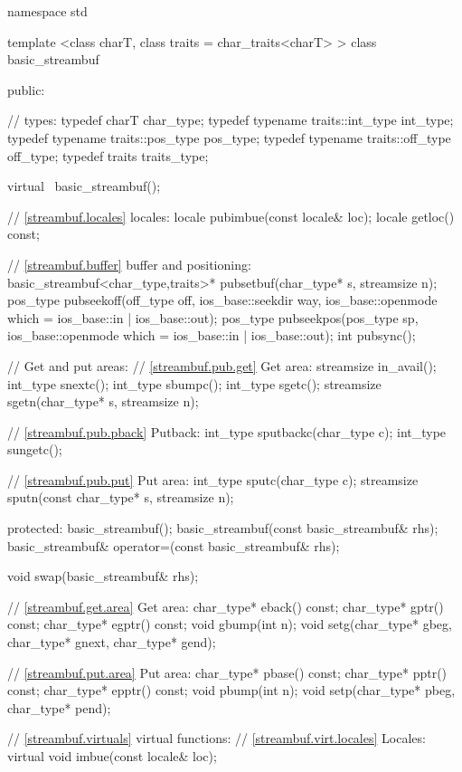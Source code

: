 %
\begin{codeblock}
namespace std {
  template <class charT, class traits = char_traits<charT> >
  class basic_streambuf {
  public:

    // types:
    typedef charT                     char_type;
    typedef typename traits::int_type int_type;
    typedef typename traits::pos_type pos_type;
    typedef typename traits::off_type off_type;
    typedef traits                    traits_type;

    virtual ~basic_streambuf();

    // \ref{streambuf.locales} locales:
    locale   pubimbue(const locale& loc);
    locale   getloc() const;

    // \ref{streambuf.buffer} buffer and positioning:
    basic_streambuf<char_type,traits>*
       pubsetbuf(char_type* s, streamsize n);
    pos_type pubseekoff(off_type off, ios_base::seekdir way,
      ios_base::openmode which =
          ios_base::in | ios_base::out);
    pos_type pubseekpos(pos_type sp,
      ios_base::openmode which =
          ios_base::in | ios_base::out);
    int      pubsync();

    // Get and put areas:
    // \ref{streambuf.pub.get} Get area:
    streamsize in_avail();
    int_type snextc();
    int_type sbumpc();
    int_type sgetc();
    streamsize sgetn(char_type* s, streamsize n);

    // \ref{streambuf.pub.pback} Putback:
    int_type sputbackc(char_type c);
    int_type sungetc();

    // \ref{streambuf.pub.put} Put area:
    int_type   sputc(char_type c);
    streamsize sputn(const char_type* s, streamsize n);

  protected:
    basic_streambuf();
    basic_streambuf(const basic_streambuf& rhs);
    basic_streambuf& operator=(const basic_streambuf& rhs);

    void swap(basic_streambuf& rhs);

    // \ref{streambuf.get.area} Get area:
    char_type* eback() const;
    char_type* gptr()  const;
    char_type* egptr() const;
    void       gbump(int n);
    void       setg(char_type* gbeg, char_type* gnext, char_type* gend);

    // \ref{streambuf.put.area} Put area:
    char_type* pbase() const;
    char_type* pptr() const;
    char_type* epptr() const;
    void       pbump(int n);
    void       setp(char_type* pbeg, char_type* pend);

    // \ref{streambuf.virtuals} virtual functions:
    // \ref{streambuf.virt.locales} Locales:
    virtual void imbue(const locale& loc);

}}
\end{codeblock}
